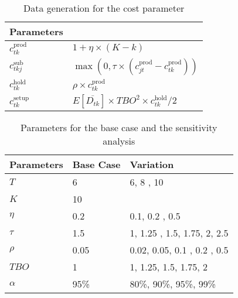\documentclass[10pt]{article}
\newcommand{\ti}{t} %
\newcommand{\Ti}{T}
\newcommand{\ka}{k} %
\newcommand{\Ka}{K}
\newcommand{\jey}{j} %
\begin{document}
\begin{table}[h]
\centering
\caption{Data generation for the cost parameter }
\begin{tabular}{ll}
\toprule
{\bf Parameters} &  \\ \midrule
$c^{\text{prod}}_{\ti \ka}$  & $1+\eta \times(\Ka-\ka)$ 
\\
$c^{\text{sub}}_{\ti \ka \jey }$  & $\max(0,\tau \times (c^{\text{prod}}_{\jey \ti} - c^{\text{prod}}_{\ti \ka}))$ 
\\ 
$c^{\text{hold}}_{\ti \ka}$  & $\rho \times c^{\text{prod}}_{\ti \ka} $ 
\\ 
$c^{\text{setup}}_{\ti \ka}$ & $E[\overline{D_{\ti \ka}}] \times TBO^2 \times c^{\text{hold}}_{\ti \ka} /2$ \\ 
\bottomrule
\end{tabular}
 \label{tab:Sub_FD_parameters}
\end{table}





\begin{table}[H]
\centering
\caption{ Parameters for the base case and the sensitivity analysis} \label{tab:BaseSensitivity}
\begin{tabular}{lll}
\toprule
{\bf Parameters} & Base Case & Variation \\ \midrule
$\Ti$   & 6 & 6, 8 , 10 \\ 
$\Ka$   & 10 & \\ 
$\eta$  &   0.2 & 0.1, 0.2 , 0.5   \\ 
$\tau$  &   1.5 & 1, 1.25 , 1.5, 1.75, 2, 2.5   \\ 
$\rho $  &   0.05 & 0.02, 0.05, 0.1 , 0.2 , 0.5   \\ 
$ TBO $  &   1 & 1, 1.25, 1.5, 1.75, 2   \\ 
$ \alpha $  &95\% & 80\%, 90\%, 95\%, 99\%  \\ 
\bottomrule 
\end{tabular}
\end{table}
\end{document}
